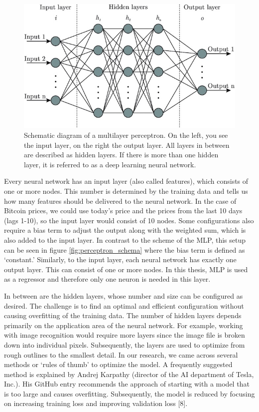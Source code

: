 \documentclass[
]{article}
\begin{document}
\begin{figure}

{\centering \includegraphics[width=0.6\linewidth]{images/MLP} 

}

\caption{Schematic diagram of a multilayer perceptron. On the left, you see the input layer, on the right the output layer. All layers in between are described as hidden layers. If there is more than one hidden layer, it is referred to as a deep learning neural network.}\label{fig:mlp_schema}
\end{figure}

Every neural network has an input layer (also called features), which
consists of one or more nodes. This number is determined by the training
data and tells us how many features should be delivered to the neural
network. In the case of Bitcoin prices, we could use today's price and
the prices from the last 10 days (lags 1-10), so the input layer would
consist of 10 nodes. Some configurations also require a bias term to
adjust the output along with the weighted sum, which is also added to
the input layer. In contrast to the scheme of the MLP, this setup can be
seen in figure \ref{fig:perceptron_schema} where the bias term is
defined as `constant.' Similarly, to the input layer, each neural
network has exactly one output layer. This can consist of one or more
nodes. In this thesis, MLP is used as a regressor and therefore only one
neuron is needed in this layer.

In between are the hidden layers, whose number and size can be
configured as desired. The challenge is to find an optimal and efficient
configuration without causing overfitting of the training data. The
number of hidden layers depends primarily on the application area of the
neural network. For example, working with image recognition would
require more layers since the image file is broken down into individual
pixels. Subsequently, the layers are used to optimize from rough
outlines to the smallest detail. In our research, we came across several
methods or `rules of thumb' to optimize the model. A frequently
suggested method is explained by Andrej Karpathy (director of the AI
department of Tesla, Inc.). His GitHub entry recommends the approach of
starting with a model that is too large and causes overfitting.
Subsequently, the model is reduced by focusing on increasing training
loss and improving validation loss {[}8{]}.
\end{document}
